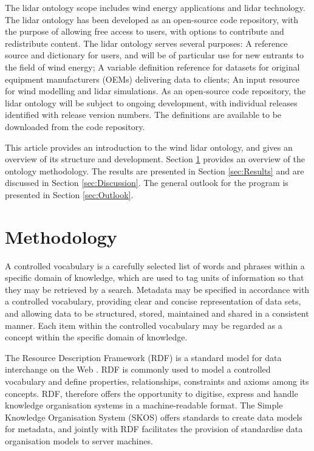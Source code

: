 \documentclass[remotesensing,article,submit,pdftex,moreauthors]{Definitions/mdpi}
\begin{document}
The lidar ontology scope includes wind energy applications and lidar technology.
The lidar ontology has been developed as an open-source code repository, with the purpose of allowing
free access to users, with options to contribute and redistribute content.
The lidar ontology serves several purposes: A reference source and dictionary for users, and will be of particular
use for new entrants to the field of wind energy;
A variable definition reference for datasets for original equipment manufacturers (OEMs) delivering data to clients;
An input resource for wind modelling and lidar simulations.
As an open-source code repository, the lidar ontology will be subject to ongoing development, with individual releases identified with release version numbers.
The definitions are available to be downloaded from the code repository.

This article provides an introduction to the wind lidar ontology, and gives an overview of its structure and development. Section \ref{sec:Methodology} provides an overview of the ontology methodology. The results are presented in Section \ref{sec:Results} and are discussed in Section \ref{sec:Discussion}. The general outlook for the program is presented in Section \ref{sec:Outlook}.


\section{Methodology}
\label{sec:Methodology}
A controlled vocabulary is a carefully selected list of words and phrases within a specific domain of knowledge, which are used to tag units of information so that they may be retrieved by a search.
Metadata may be specified in accordance with a controlled vocabulary, providing clear and concise representation of data sets, and allowing data to be structured, stored, maintained and shared in a consistent manner. 
Each item within the controlled vocabulary may be regarded as a concept
within the specific domain of knowledge.

The Resource Description Framework (RDF) is a standard model for data interchange on the Web \cite{ref-W3C-RDF}.
RDF is commonly used to model a controlled vocabulary and define properties, relationships, constraints and axioms among its concepts.
RDF, therefore offers the opportunity to digitise, express and handle knowledge organisation systems in a machine-readable format.
The Simple Knowledge Organisation System (SKOS) \cite{ref-W3C-SKOS} offers standards to create data models for metadata, and jointly with RDF facilitates the provision of standardise data organisation models to server machines.
\end{document}
